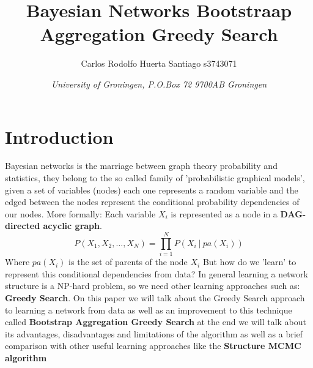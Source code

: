 \documentclass{article}
\title{\textbf{\huge Bayesian Networks Bootstraap Aggregation Greedy Search}}
\author{Carlos Rodolfo Huerta Santiago s3743071}
\date{\textit{University of Groningen, P.O.Box 72 9700AB Groningen}}
\begin{document}
	\maketitle %
	\thispagestyle{empty}

	\section{Introduction}
	Bayesian networks is the marriage between graph theory probability and
	statistics, they belong to the so called family of 'probabilistic graphical
	models', given a set of variables (nodes) each one represents a random
	variable and the edged between the nodes represent the conditional
	probability dependencies of our nodes. More formally: Each variable $X_{i}$
	is represented as a node in a \textbf{DAG-directed acyclic
	graph}\cite{bnsBasics}.
	\begin{equation}
		P(X_{1}, X_{2}, \dots ,X_{N}) = \prod_{i=1}^{N} P(X_{i} \ | \ pa(X_{i}))	
	\end{equation}
	Where $pa(X_{i})$ is the set of parents of the node $X_{i}$
	But how do we 'learn' to represent
	this conditional dependencies from data? In general learning a network
	structure is a NP-hard problem, so we need other learning approaches such as:
	\textbf{Greedy Search}. On this paper we will talk about the Greedy Search
	approach to learning a network from data as well as an improvement to this
	technique called \textbf{Bootstrap Aggregation Greedy Search} at the end we will talk
	about its advantages, disadvantages and limitations of the algorithm as well
	as a brief comparison with other useful learning approaches like the
	\textbf{Structure MCMC algorithm}
\end{document}
